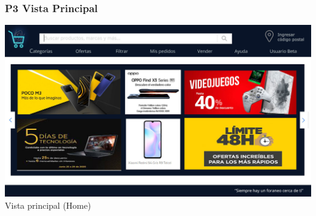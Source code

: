 \documentclass[14pt]{article}
\begin{document}
            \subsubsection{P3 Vista Principal}\label{P3 Vista Principal}
                \begin{center}
                    \includegraphics[height=0.55\textwidth]{VistaPrincipal.jpg}
                    \label{fig:VistaPrincipal} \\ [Figura 4] Vista principal (Home)
                \end{center}
\end{document}
